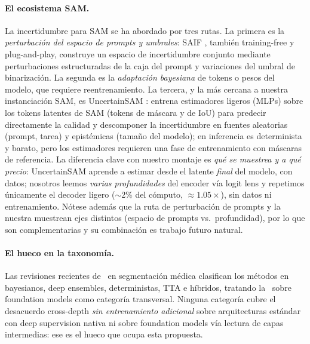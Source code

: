 \documentclass[12pt,a4paper]{article}
\newcommand{\UQ}{\text{UQ}}
\begin{document}
\paragraph{El ecosistema SAM.}
La incertidumbre para SAM se ha abordado por tres rutas.
La primera es la \emph{perturbación del espacio de prompts y umbrales}: SAIF \citep{wang2026saif}, también training-free y plug-and-play, construye un espacio de incertidumbre conjunto mediante perturbaciones estructuradas de la caja del prompt y variaciones del umbral de binarización.
La segunda es la \emph{adaptación bayesiana} de tokens o pesos del modelo, que requiere reentrenamiento.
La tercera, y la más cercana a nuestra instanciación SAM, es UncertainSAM \citep{kaiser2025uncertainsam}: entrena estimadores ligeros (MLPs) sobre los tokens latentes de SAM (tokens de máscara y de IoU) para predecir directamente la calidad y descomponer la incertidumbre en fuentes aleatorias (prompt, tarea) y epistémicas (tamaño del modelo); en inferencia es determinista y barato, pero los estimadores requieren una fase de entrenamiento con máscaras de referencia.
La diferencia clave con nuestro montaje es \emph{qué se muestrea y a qué precio}: UncertainSAM aprende a estimar desde el latente \emph{final} del modelo, con datos; nosotros leemos \emph{varias profundidades} del encoder vía logit lens y repetimos únicamente el decoder ligero ($\sim$2\% del cómputo, $\approx 1.05\times$), sin datos ni entrenamiento.
Nótese además que la ruta de perturbación de prompts y la nuestra muestrean ejes distintos (espacio de prompts vs.~profundidad), por lo que son complementarias y su combinación es trabajo futuro natural.

\paragraph{El hueco en la taxonomía.}
Las revisiones recientes de \UQ\ en segmentación médica \citep{ziaee2026uqsegsurvey} clasifican los métodos en bayesianos, deep ensembles, deterministas, TTA e híbridos, tratando la \UQ\ sobre foundation models como categoría transversal.
Ninguna categoría cubre el desacuerdo cross-depth \emph{sin entrenamiento adicional} sobre arquitecturas estándar con deep supervision nativa ni sobre foundation models vía lectura de capas intermedias: ese es el hueco que ocupa esta propuesta.
\end{document}
